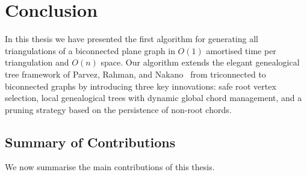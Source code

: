 
\chapter{Conclusion}
\label{ch:conclusion}

In this thesis we have presented the first algorithm for generating all triangulations of a biconnected plane graph in \(O(1)\) amortised time per triangulation and \(O(n)\) space. 
Our algorithm extends the elegant genealogical tree framework of Parvez, Rahman, and Nakano~\cite{parvez2011} from triconnected to biconnected graphs by introducing three key innovations: safe root vertex selection, local genealogical trees with dynamic global chord management, and a pruning strategy based on the persistence of non-root chords.

\section{Summary of Contributions}
\label{sec:contributions}

We now summarise the main contributions of this thesis.

